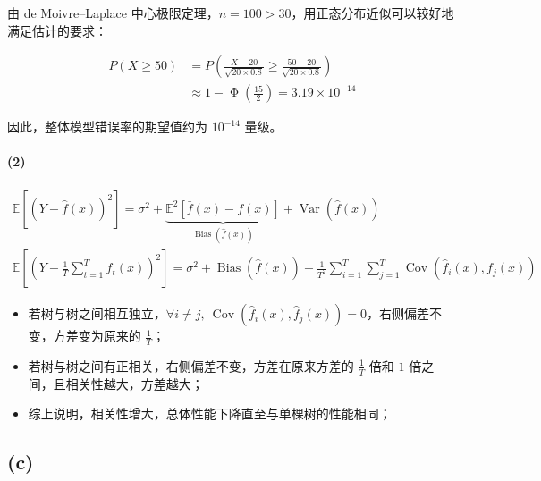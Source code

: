 \documentclass{ctexart}
\begin{document}
由 de Moivre--Laplace
中心极限定理，\(n=100>30\)，用正态分布近似可以较好地满足估计的要求：


\begin{equation*}
\begin{aligned}
P(X\ge 50)&=P\left(\frac{X-20}{\sqrt{20\times0.8}}\ge\frac{50-20}{\sqrt{20\times 0.8}}\right)\\
&\approx1-\operatorname{\Phi}\left(\frac{15}{2}\right)=3.19\times 10^{-14}
\end{aligned}
\end{equation*}


因此，整体模型错误率的期望值约为 \(10^{-14}\) 量级。

\paragraph{(2)}\label{section-17}


\begin{gather*}
\mathbb E[(Y-\hat f(x))^2] = \sigma^2+ \underbrace{\mathbb E^2[\bar f(x)-f(x)]}_{\operatorname{Bias}(\hat f(x))} + \operatorname{Var}(\hat f(x)) \\
\mathbb E\left[\left(Y - \frac{1}{T}\sum_{t=1}^T\hat f_t(x)\right)^2\right] = \sigma^2+\operatorname{Bias}(\hat f(x))+\frac{1}{T^2}\sum_{i=1}^T\sum_{j=1}^T\operatorname{Cov}(\hat f_i(x), f_j(x))
\end{gather*}


\begin{itemize}

\item
  若树与树之间相互独立，\(\forall i\ne j,~\operatorname{Cov}(\hat f_i(x),\hat f_j(x))=0\)，右侧偏差不变，方差变为原来的
  \(\frac{1}{T}\)；
\item
  若树与树之间有正相关，右侧偏差不变，方差在原来方差的 \(\frac{1}{T}\)
  倍和 \(1\) 倍之间，且相关性越大，方差越大；
\item
  综上说明，相关性增大，总体性能下降直至与单棵树的性能相同；
\end{itemize}

\subsection{(c)}\label{c-1}
\end{document}
